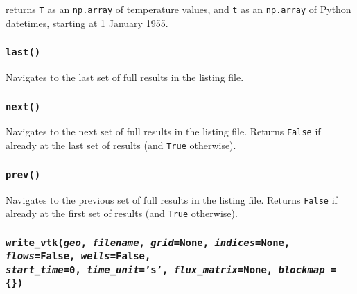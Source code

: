 returns \texttt{T} as an \texttt{np.array} of temperature values, and \texttt{t} as an \texttt{np.array} of Python datetimes, starting at 1 January 1955.

\begin{snugshade}
\subsubsection{\texttt{last()}}
\end{snugshade}
\label{sec:t2listing:last}

Navigates to the last set of full results in the listing file.

\begin{snugshade}
\subsubsection{\texttt{next()}}
\end{snugshade}
\label{sec:t2listing:next}

Navigates to the next set of full results in the listing file.  Returns \texttt{False} if already at the last set of results (and \texttt{True} otherwise).

\begin{snugshade}
\subsubsection{\texttt{prev()}}
\end{snugshade}
\label{sec:t2listing:prev}

Navigates to the previous set of full results in the listing file.  Returns \texttt{False} if already at the first set of results (and \texttt{True} otherwise).

\begin{snugshade}
\subsubsection{\texttt{write\_vtk(\emph{geo}, \emph{filename}, \emph{grid}=None, \emph{indices}=None, \emph{flows}=False,
\emph{wells}=False,\\
\emph{start\_time}=0, \emph{time\_unit}='s', \emph{flux\_matrix}=None, \emph{blockmap} = \{\})}}
\end{snugshade}
\label{sec:t2listing:write_vtk}

